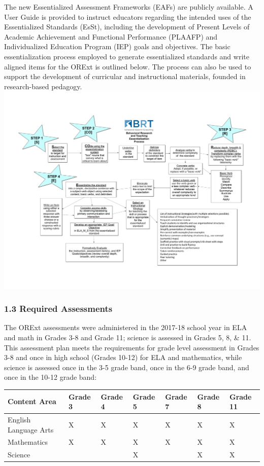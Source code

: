 \documentclass[]{article}
\begin{document}
The new Essentialized Assessment Frameworks (EAFs) are publicly
available. A User Guide is provided to instruct educators regarding the
intended uses of the Essentialized Standards (EsSt), including the
development of Present Levels of Academic Achievement and Functional
Performance (PLAAFP) and Individualized Education Program (IEP) goals
and objectives. The basic essentialization process employed to generate
essentialized standards and write aligned items for the ORExt is
outlined below. The process can also be used to support the development
of curricular and instructional materials, founded in research-based
pedagogy. \FloatBarrier
\includegraphics{Figures/Essentialization/Essentialization.pdf} \newpage

\subsubsection{1.3 Required Assessments}\label{required-assessments}

The ORExt assessments were administered in the 2017-18 school year in
ELA and math in Grades 3-8 and Grade 11; science is assessed in Grades
5, 8, \& 11. This assessment plan meets the requirements for grade level
assessment in Grades 3-8 and once in high school (Grades 10-12) for ELA
and mathematics, while science is assessed once in the 3-5 grade band,
once in the 6-9 grade band, and once in the 10-12 grade band:

\begin{longtable}[]{@{}lllllll@{}}
\toprule
\textbf{Content Area} & \textbf{Grade 3} & \textbf{Grade 4} &
\textbf{Grade 5} & \textbf{Grade 7} & \textbf{Grade 8} & \textbf{Grade
11}\tabularnewline
\midrule
\endhead
English Language Arts & X & X & X & X & X & X\tabularnewline
Mathematics & X & X & X & X & X & X\tabularnewline
Science & & & X & & X & X\tabularnewline
\bottomrule
\end{longtable}
\end{document}
